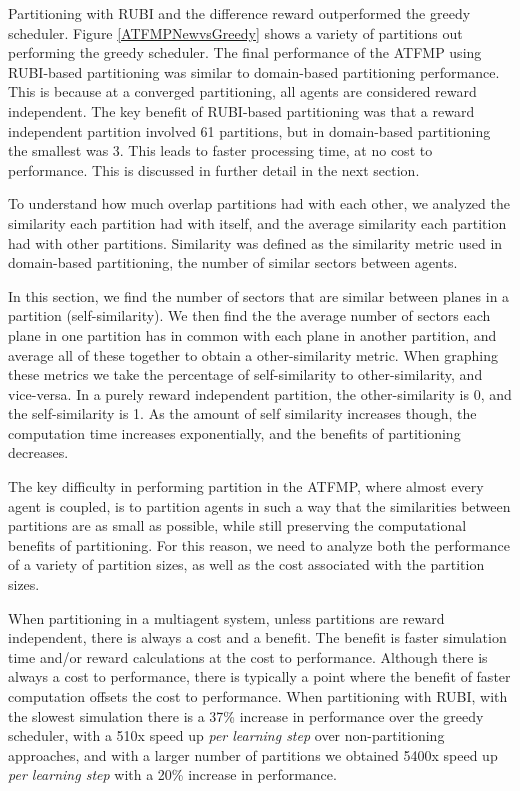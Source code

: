 \documentclass{aamas2014}
\begin{document}
Partitioning with RUBI and the difference reward outperformed the greedy scheduler. Figure \ref{ATFMPNewvsGreedy} shows a variety of partitions out performing the greedy scheduler. The final performance of the ATFMP using RUBI-based partitioning was similar to domain-based partitioning performance. This is because at a converged partitioning, all agents are considered reward independent. The key benefit of RUBI-based partitioning was that a reward independent partition involved 61 partitions, but in domain-based partitioning the smallest was 3. This leads to faster processing time, at no cost to performance. This is discussed in further detail in the next section.

To understand how much overlap partitions had with each other, we analyzed the similarity each partition had with itself, and the average similarity each partition had with other partitions. Similarity was defined as the similarity metric used in domain-based partitioning, the number of similar sectors between agents.

In this section, we find the number of sectors that are similar between planes in a partition (self-similarity). We then find the the average number of sectors each plane in one partition has in common with each plane in another partition, and average all of these together to obtain a other-similarity metric. When graphing these metrics we take the percentage of self-similarity to other-similarity, and vice-versa. In a purely reward independent partition, the other-similarity is 0, and the self-similarity is 1. As the amount of self similarity increases though, the computation time increases exponentially, and the benefits of partitioning decreases.

The key difficulty in performing partition in the ATFMP, where almost every agent is coupled, is to partition agents in such a way that the similarities between partitions are as small as possible, while still preserving the computational benefits of partitioning. For this reason, we need to analyze both the performance of a variety of partition sizes, as well as the cost associated with the partition sizes.

When partitioning in a multiagent system, unless partitions are reward independent, there is always a cost and a benefit. The benefit is faster simulation time and/or reward calculations at the cost to performance. Although there is always a cost to performance, there is typically a point where the benefit of faster computation offsets the cost to performance. When partitioning with RUBI, with the slowest simulation there is a 37\% increase in performance over the greedy scheduler, with a 510x speed up \textit{per learning step} over non-partitioning approaches, and with a larger number of partitions we obtained 5400x speed up \textit{per learning step} with a 20\% increase in performance.
\end{document}
